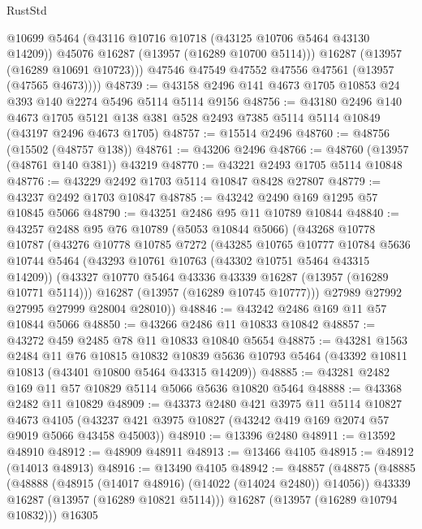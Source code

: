\begin{lexlean}{RustStd}
\begin{coremodule}
            @10699
            @5464
            (@43116 @10716 @10718 (@43125 @10706 @5464 @43130 @14209))
            @45076
            @16287
            (@13957 (@16289 @10700 @5114)))
          @16287
          (@13957 (@16289 @10691 @10723)))
        @47546
        @47549
        @47552
        @47556
        @47561
        (@13957 (@47565 @4673))))
@48739 := @43158 @2496 @141 @4673 @1705 @10853 @24 @393 @140 @2274 @5496 @5114 @5114 @9156
@48756 := @43180
    @2496
    @140
    @4673
    @1705
    @5121
    @138
    @381
    @528
    @2493
    @7385
    @5114
    @5114
    @10849
    (@43197 @2496 @4673 @1705)
@48757 := @15514 @2496
@48760 := @48756 (@15502 (@48757 @138))
@48761 := @43206 @2496
@48766 := @48760 (@13957 (@48761 @140 @381)) @43219
@48770 := @43221 @2493 @1705 @5114 @10848
@48776 := @43229 @2492 @1703 @5114 @10847 @8428 @27807
@48779 := @43237 @2492 @1703 @10847
@48785 := @43242 @2490 @169 @1295 @57 @10845 @5066
@48790 := @43251 @2486 @95 @11 @10789 @10844
@48840 := @43257
    @2488
    @95
    @76
    @10789
    (@5053 @10844 @5066)
    (@43268
      @10778
      @10787
      (@43276
        @10778
        @10785
        @7272
        (@43285
          @10765
          @10777
          @10784
          @5636
          @10744
          @5464
          (@43293 @10761 @10763 (@43302 @10751 @5464 @43315 @14209))
          (@43327 @10770 @5464 @43336 @43339 @16287 (@13957 (@16289 @10771 @5114)))
          @16287
          (@13957 (@16289 @10745 @10777)))
        @27989
        @27992
        @27995
        @27999
        @28004
        @28010))
@48846 := @43242 @2486 @169 @11 @57 @10844 @5066
@48850 := @43266 @2486 @11 @10833 @10842
@48857 := @43272 @459 @2485 @78 @11 @10833 @10840 @5654
@48875 := @43281
    @1563
    @2484
    @11
    @76
    @10815
    @10832
    @10839
    @5636
    @10793
    @5464
    (@43392 @10811 @10813 (@43401 @10800 @5464 @43315 @14209))
@48885 := @43281 @2482 @169 @11 @57 @10829 @5114 @5066 @5636 @10820 @5464
@48888 := @43368 @2482 @11 @10829
@48909 := @43373
    @2480
    @421
    @3975
    @11
    @5114
    @10827
    @4673
    @4105
    (@43237 @421 @3975 @10827 (@43242 @419 @169 @2074 @57 @9019 @5066 @43458 @45003))
@48910 := @13396 @2480
@48911 := @13592 @48910
@48912 := @48909 @48911
@48913 := @13466 @4105
@48915 := @48912 (@14013 @48913)
@48916 := @13490 @4105
@48942 := @48857
    (@48875
      (@48885
        (@48888 (@48915 (@14017 @48916) (@14022 (@14024 @2480)) @14056))
        @43339
        @16287
        (@13957 (@16289 @10821 @5114)))
      @16287
      (@13957 (@16289 @10794 @10832)))
    @16305

\end{coremodule}
\end{lexlean}

